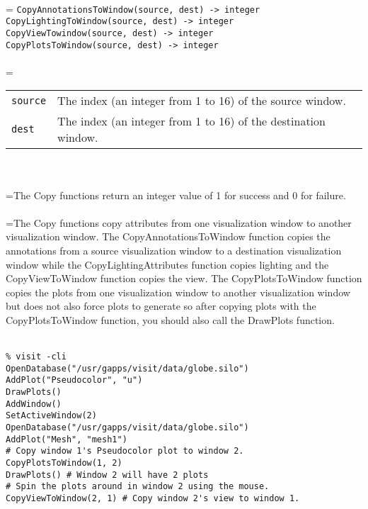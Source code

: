 \documentclass[10pt,a4paper]{report}
\begin{document}
 \\ 
\hangindent=\parindent 
\verb!CopyAnnotationsToWindow(source, dest) -> integer!\\ 
\verb!CopyLightingToWindow(source, dest) -> integer!\\ 
\verb!CopyViewTowindow(source, dest) -> integer!\\ 
\verb!CopyPlotsToWindow(source, dest) -> integer!\\ [-3mm]

 \\ 
\hangindent=\parindent 
\begin{tabular}{lp{9cm}}
\verb!source! & The index (an integer from 1 to 16) of the source window. \\
\verb!dest! & The index (an integer from 1 to 16) of the destination window. \\
\end{tabular} \\[-2mm]


 \\ 
\hangindent=\parindent The Copy functions return an integer value of 1 for success and 0 for failure. \\[-3mm] 

 \\ 
\hangindent=\parindent The Copy functions copy attributes from one visualization window to another visualization window. The CopyAnnotationsToWindow function copies the annotations from a source visualization window to a destination visualization window while the CopyLightingAttributes function copies lighting and the CopyViewToWindow function copies the view. The CopyPlotsToWindow function copies the plots from one visualization window to another visualization window but does not also force plots to generate so after copying plots with the CopyPlotsToWindow function, you should also call the DrawPlots function. \\[-3mm] 

\\[-6mm]
\begin{verbatim}% visit -cli
OpenDatabase("/usr/gapps/visit/data/globe.silo")
AddPlot("Pseudocolor", "u")
DrawPlots()
AddWindow()
SetActiveWindow(2)
OpenDatabase("/usr/gapps/visit/data/globe.silo")
AddPlot("Mesh", "mesh1")
# Copy window 1's Pseudocolor plot to window 2.
CopyPlotsToWindow(1, 2) 
DrawPlots() # Window 2 will have 2 plots
# Spin the plots around in window 2 using the mouse.
CopyViewToWindow(2, 1) # Copy window 2's view to window 1.
\end{verbatim}
\newpage
\end{document}
